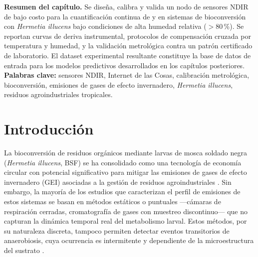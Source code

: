 
\begin{center}
\small
\textbf{Resumen del capítulo.}
Se diseña, calibra y valida un nodo de sensores NDIR de bajo costo para
la cuantificación continua de  y  en sistemas de
bioconversión con \textit{Hermetia illucens} bajo condiciones de alta
humedad relativa ($>80$\,\%). Se reportan curvas de deriva instrumental,
protocolos de compensación cruzada por temperatura y humedad, y la
validación metrológica contra un patrón certificado de laboratorio.
El dataset experimental resultante constituye la base de datos de entrada
para los modelos predictivos desarrollados en los capítulos posteriores.
\textbf{Palabras clave:} sensores NDIR, Internet de las Cosas,
calibración metrológica, bioconversión, emisiones de gases de efecto
invernadero, \textit{Hermetia illucens}, residuos agroindustriales tropicales.
\end{center}

\section{Introducción}
\label{sec:cap2_intro}

La bioconversión de residuos orgánicos mediante larvas de mosca soldado
negra (\textit{Hermetia illucens}, BSF) se ha consolidado como una
tecnología de economía circular con potencial significativo para mitigar
las emisiones de gases de efecto invernadero (GEI) asociadas a la gestión
de residuos agroindustriales
\autocite{bermudez-serranoComprehensiveUtilizationBlack2023,
surendraBioconversionOrganicWastes2016}.
Sin embargo, la mayoría de los estudios que caracterizan el perfil de
emisiones de estos sistemas se basan en métodos estáticos o puntuales
---cámaras de respiración cerradas, cromatografía de gases con muestreo
discontinuo--- que no capturan la dinámica temporal real del metabolismo
larval.
Estos métodos, por su naturaleza discreta, tampoco permiten detectar
eventos transitorios de anaerobiosis, cuya ocurrencia es intermitente y
dependiente de la microestructura del sustrato
\autocite{rossiEstimatingDynamicsGreenhouse2024a,
fuhrmannComprehensiveIndustryrelevantBlack2025a}.

